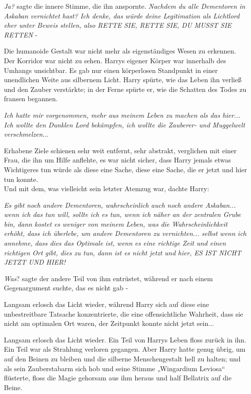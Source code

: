 {\emph{Ja?} sagte die innere Stimme, die ihn anspornte. \emph{Nachdem du alle Dementoren in Askaban vernichtet hast? Ich denke, das würde deine Legitimation als Lichtlord eher unter Beweis stellen, also RETTE SIE, RETTE SIE, DU MUSST SIE RETTEN} -

Die humanoide Gestalt war nicht mehr als eigenständiges Wesen zu erkennen.\\ Der Korridor war nicht zu sehen. Harrys eigener Körper war innerhalb des Umhangs unsichtbar. Es gab nur einen körperlosen Standpunkt in einer unendlichen Weite aus silbernem Licht. Harry spürte, wie das Leben ihn verließ und den Zauber verstärkte; in der Ferne spürte er, wie die Schatten des Todes zu fransen begannen.

\emph{Ich hatte mir vorgenommen, mehr aus meinem Leben zu machen als das hier... Ich wollte den Dunklen Lord bekämpfen, ich wollte die Zauberer- und Muggelwelt verschmelzen.}..

Erhabene Ziele schienen sehr weit entfernt, sehr abstrakt, verglichen mit einer Frau, die ihn um Hilfe anflehte, es war nicht sicher, dass Harry jemals etwas Wichtigeres tun würde als diese eine Sache, diese eine Sache, die er jetzt und hier tun konnte.\\ Und mit dem, was vielleicht sein letzter Atemzug war, dachte Harry:

\emph{Es gibt noch andere Dementoren, wahrscheinlich auch noch andere Askaban... wenn ich das tun will, sollte ich es tun, wenn ich näher an der zentralen Grube bin, dann kostet es weniger von meinem Leben, was die Wahrscheinlichkeit erhöht, dass ich überlebe, um andere Dementoren zu vernichten... selbst wenn ich annehme, dass dies das Optimale ist, wenn es eine richtige Zeit und einen richtigen Ort gibt, dies zu tun, dann ist es nicht jetzt und hier, ES IST NICHT JETZT UND HIER!}

\emph{Was}? sagte der andere Teil von ihm entrüstet, während er nach einem Gegenargument suchte, das es nicht gab -

Langsam erlosch das Licht wieder, während Harry sich auf diese eine unbestreitbare Tatsache konzentrierte, die eine offensichtliche Wahrheit, dass sie nicht am optimalen Ort waren, der Zeitpunkt konnte nicht jetzt sein...

Langsam erlosch das Licht wieder. Ein Teil von Harrys Leben floss zurück in ihn. Ein Teil war als Strahlung verloren gegangen. Aber Harry hatte genug übrig, um auf den Beinen zu bleiben und die silberne Menschengestalt hell zu halten; und als sein Zauberstabarm sich hob und seine Stimme „Wingardium Leviosa“ flüsterte, floss die Magie gehorsam aus ihm heraus und half Bellatrix auf die Beine.

}
